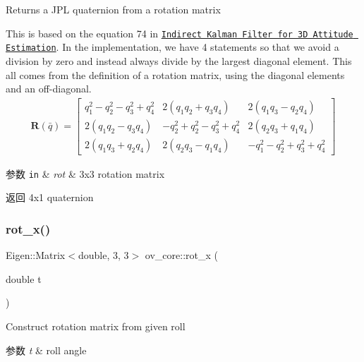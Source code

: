 Returns a J\+PL quaternion from a rotation matrix 

This is based on the equation 74 in \href{http://mars.cs.umn.edu/tr/reports/Trawny05b.pdf}{\tt Indirect Kalman Filter for 3D Attitude Estimation}. In the implementation, we have 4 statements so that we avoid a division by zero and instead always divide by the largest diagonal element. This all comes from the definition of a rotation matrix, using the diagonal elements and an off-\/diagonal. \begin{align*} \mathbf{R}(\bar{q})= \begin{bmatrix} q_1^2-q_2^2-q_3^2+q_4^2 & 2(q_1q_2+q_3q_4) & 2(q_1q_3-q_2q_4) \\ 2(q_1q_2-q_3q_4) & -q_2^2+q_2^2-q_3^2+q_4^2 & 2(q_2q_3+q_1q_4) \\ 2(q_1q_3+q_2q_4) & 2(q_2q_3-q_1q_4) & -q_1^2-q_2^2+q_3^2+q_4^2 \end{bmatrix} \end{align*}


\begin{DoxyParams}[1]{参数}
\mbox{\tt in}  & {\em rot} & 3x3 rotation matrix \\
\hline
\end{DoxyParams}
\begin{DoxyReturn}{返回}
4x1 quaternion 
\end{DoxyReturn}
\mbox{\label{namespaceov__core_ab3268e0844642c119fe45c2880afb581}} 
\subsubsection{\texorpdfstring{rot\+\_\+x()}{rot\_x()}}
{\footnotesize\ttfamily Eigen\+::\+Matrix$<$double, 3, 3$>$ ov\+\_\+core\+::rot\+\_\+x (\begin{DoxyParamCaption}\item[{double}]{t }\end{DoxyParamCaption})\hspace{0.3cm}{\ttfamily [inline]}}



Construct rotation matrix from given roll 


\begin{DoxyParams}{参数}
{\em t} & roll angle \\
\hline
\end{DoxyParams}
\mbox{\label{namespaceov__core_a2a212d931b6f4325052b3169ad6161a3}} 
